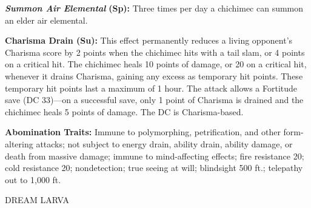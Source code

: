\documentclass{article}
\begin{document}
\textit{\textbf{Summon Air Elemental }}\textbf{(Sp):} Three times per day a chichimec 
can summon an elder air elemental. 

\textbf{Charisma Drain (Su):} This effect permanently reduces a living opponent's 
Charisma score by 2 points when the chichimec hits with a tail slam, or 4 points 
on a critical hit. The chichimec heals 10 points of damage, or 20 on a critical 
hit, whenever it drains Charisma, gaining any excess as temporary hit points. These 
temporary hit points last a maximum of 1 hour. The attack allows a Fortitude save 
(DC 33)---on a successful save, only 1 point of Charisma is drained and the chichimec 
heals 5 points of damage. The DC is Charisma-based.

\textbf{Abomination Traits:} Immune to polymorphing, petrification, and other form-altering 
attacks; not subject to energy drain, ability drain, ability damage, or death from 
massive damage; immune to mind-affecting effects; fire resistance 20; cold resistance 
20; nondetection; true seeing at will; blindsight 500 ft.; telepathy out to 1,000 
ft. 

\vspace{12pt}
{\LARGE{}DREAM LARVA }
\end{document}
